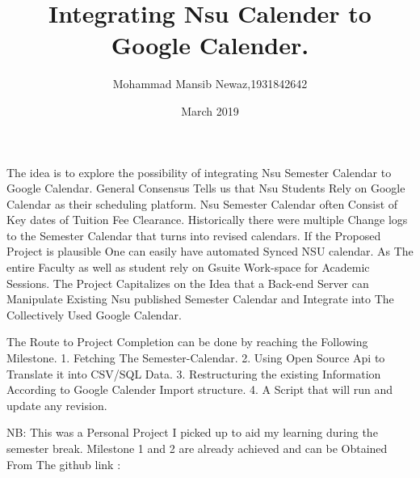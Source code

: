 \documentclass[12pt]{extarticle}
\title{Integrating Nsu Calender to Google Calender.}
\author{Mohammad Mansib Newaz,1931842642}
\date{March 2019}
\begin{document}
\maketitle
The idea is to explore the possibility of integrating Nsu Semester Calendar to Google Calendar. 
General Consensus Tells us that Nsu Students Rely on Google Calendar as their scheduling platform. Nsu Semester Calendar often Consist of Key dates of Tuition Fee Clearance. Historically there were multiple Change logs to the Semester Calendar that turns into revised calendars. If the Proposed Project is plausible One can easily have automated Synced NSU calendar. As The entire Faculty as well as student rely on Gsuite Work-space for Academic Sessions. The Project Capitalizes on the Idea that a Back-end Server can Manipulate Existing Nsu published Semester Calendar and Integrate into The Collectively Used Google Calendar. 

The Route to Project Completion can be done by reaching the Following Milestone. 
1. Fetching The Semester-Calendar. 
2. Using Open Source Api to Translate it into CSV/SQL Data. 
3. Restructuring the existing Information According to Google Calender Import structure. 
4. A Script that will run and update any revision. 
 
 
 NB: This was a Personal Project I picked up to aid my learning during the semester break. Milestone 1 and 2 are already achieved and can be Obtained From The github link : 




\end{document}
